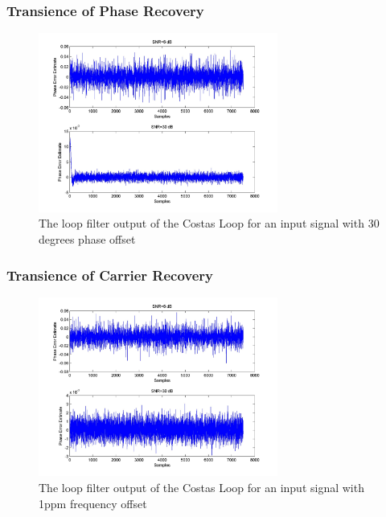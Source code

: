 \documentclass[]{article}
\begin{document}
\subsubsection{Transience of Phase Recovery}
\begin{figure}[H]
\centering
\hspace*{-2cm}\includegraphics[width=0.7\textwidth]{qpLoopFilterpo_costas1.jpg}
\caption{The loop filter output of the Costas Loop for an input signal with 30 degrees phase offset}
\end{figure}

\subsubsection{Transience of Carrier Recovery}
\begin{figure}[H]
\centering
\hspace*{-2cm}\includegraphics[width=0.7\textwidth]{qpLoopFilterfo_costas1.jpg}
\caption{The loop filter output of the Costas Loop for an input signal with 1ppm frequency offset}
\end{figure}
\end{document}
